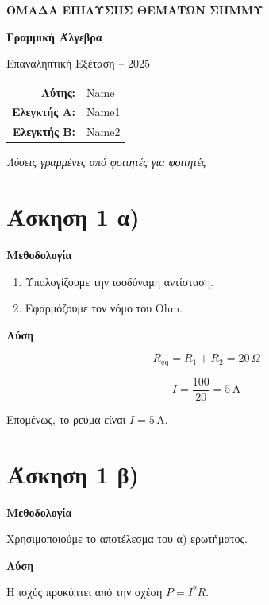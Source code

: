 \documentclass[a4paper,11pt]{extarticle}
\providecommand{\tightlist}{\setlength{\itemsep}{0pt}\setlength{\parskip}{0pt}}
\begin{document}
\begin{titlepage}
\centering
\vspace*{2.4cm}
{\Large\bfseries\color{accent} ΟΜΑΔΑ ΕΠΙΛΥΣΗΣ ΘΕΜΑΤΩΝ ΣΗΜΜΥ\par}
\vspace{1.4cm}
{\Huge\bfseries Γραμμική Άλγεβρα\par}
\vspace{0.7cm}
{\Large Επαναληπτική Εξέταση -- 2025\par}
\vspace{2cm}
\begin{tabular}{@{}rl@{}}
\textbf{Λύτης:} & Name \\
\textbf{Ελεγκτής Α:} & Name1 \\
\textbf{Ελεγκτής Β:} & Name2 \\
\end{tabular}
\vfill
{\normalsize\itshape Λύσεις γραμμένες από φοιτητές για φοιτητές\par}
\vspace{1cm}
\end{titlepage}

\section{Άσκηση 1 α)}\label{ux3acux3c3ux3baux3b7ux3c3ux3b7-1-ux3b1}

\textbf{Μεθοδολογία}

\begin{enumerate}
\def\labelenumi{\arabic{enumi}.}
\tightlist
\item
  Υπολογίζουμε την ισοδύναμη αντίσταση.
\item
  Εφαρμόζουμε τον νόμο του Ohm.
\end{enumerate}

\textbf{Λύση}

\[
R_{\mathrm{eq}} = R_1+R_2 = 20\,\Omega
\]

\[
I=\frac{100}{20}=5\,\mathrm{A}
\]

Επομένως, το ρεύμα είναι \(I=5\,\mathrm{A}\).

\section{Άσκηση 1 β)}\label{ux3acux3c3ux3baux3b7ux3c3ux3b7-1-ux3b2}

\textbf{Μεθοδολογία}

Χρησιμοποιούμε το αποτέλεσμα του α) ερωτήματος.

\textbf{Λύση}

Η ισχύς προκύπτει από την σχέση \(P=I^2R\).
\end{document}
